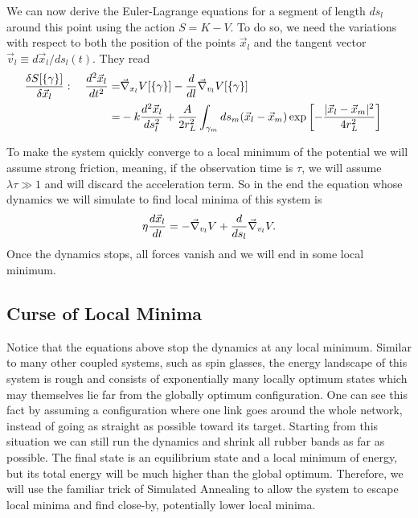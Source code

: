 \documentclass[nofootinbib,preprint,floatfix,titlepage,superscriptaddress]{revtex4} %
\newcommand{\outNim}[1]{}
\begin{document}
\outNim{
{
\color{red} !!! Needs correction!!!}
\[K_l [\gamma_l]\equiv \int_{\gamma_l} dl \left|d^2 \vec{x}_l \over dt dl\right|^2.\]
} %

We can now derive the Euler-Lagrange equations for a segment of length $ds_l$ around this point using the action $S = K- V$. To do so, we need the variations with respect to both the position of the points $\vec{x}_l$ and the tangent vector $\vec{v}_l \equiv  d\vec{x}_l/ds_l(t)$. They read 
\begin{align} 
{\delta S[\{\gamma\}] \over \delta \vec{x}_l} : \quad {d^2 \vec{x}_l \over dt^2 }  
=&  \vec{\nabla}_{{x}_l} V[\{\gamma\}]- {d\over dl} \vec{\nabla}_{{v}_l} V[\{\gamma\}] \cr
=& -k {d^2\vec{x}_l\over ds_l^2} + {A\over 2 r_L^2}\int_{\gamma_m} ds_m
 (\vec{x}_l-\vec{x}_m)\exp\left[- {|\vec{x}_l-\vec{x}_m|^2 \over 4 r_L^2}\right]
\end{align}


To make the system quickly converge to a local minimum of the potential we will assume strong friction, meaning, if the observation time is $\tau$, we will assume $\lambda \tau \gg 1$ and will discard the acceleration term. So in the end the equation whose dynamics we will simulate to find local minima of this system is 
\begin{equation}
\eta {d \vec{x}_l \over dt }  
= - \vec{\nabla}_{{v}_l} V + {d\over ds_l} \vec{\nabla}_{{v}_l} V\label{eq:Langevin1}.
\end{equation}
Once the dynamics stops, all forces vanish and we will end in some local minimum. 


\subsection{Curse of Local Minima \label{ap:np}}
Notice that the equations above stop the dynamics at any local minimum. 
Similar to many other coupled systems, such as spin glasses\citep{parisi2002physical,pelissetto2002critical}, the energy landscape of this system is rough and consists of exponentially many locally optimum states which may themselves lie far from the globally optimum configuration. One can see this fact by assuming a configuration where one link goes around the whole network, instead of going as  straight as possible toward its target. Starting from this situation we can still run the dynamics and shrink all rubber bands as far as possible. The final state is an equilibrium state and a local minimum of energy, but its total energy will be much higher than the global optimum. Therefore, we will use the familiar trick of Simulated Annealing to allow the system to escape local minima and find close-by, potentially lower local minima.  
\end{document}
